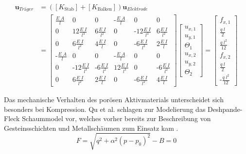  \begin{align}
    [K_{\text{Elektrode}}] \boldsymbol{u}_{Träger} &= ([K_{\text{Stab}}] + [K_{\text{Balken}}])\boldsymbol{u}_{Elektrode}\\
    &= 
    \begin{bmatrix}
        \frac{E \; A}{l} & 0     & 0     &  \text{-}\frac{E \; A}{l}  & 0 & 0 \\
        0 & 12 \frac{E \; I}{l^3}     & 6 \frac{E \; I}{l^2} & 0    &\text{-}12\frac{E \; I}{l^3}  & 6 \frac{E \; I}{l^2}       \\
        0 & 6 \frac{E \; I}{l^2} & 4 \frac{E \; I}{l}  & 0    & \text{-}6 \frac{E \; I}{l^2}  & 2 \frac{E \; I}{l} \\
        \text{-}\frac{E \; A}{l} & 0     & 0     &  \text{-}\frac{E \; A}{l}  & 0 & 0 \\
        0 & \text{-}12\frac{E \; I}{l^3}    & \text{-}6 \frac{E \; I}{l^2}& 12\frac{E \; I}{l^3}  & 0    & \text{-}6 \frac{E \; I}{l^2}      \\
        0 & 6 \frac{E \; I}{l^2} & 2 \frac{E \; I}{l} & 0    & \text{-}6 \frac{E \; I}{l^2} & 4 \frac{E \; I}{l}
    \end{bmatrix}
    \begin{bmatrix}
        u_{x,1}  \\
        u_{y,1}  \\
        \Theta_1 \\
        u_{x,2}  \\
        u_{y,2}  \\
        \Theta_2
    \end{bmatrix}
    = 
    \begin{bmatrix}
        f_{x,1} \\
        \frac{q \; l}{2}  \\
        \frac{q \; l^2}{12} \\
        f_{x,2} \\
        \frac{q \; l}{2}  \\
        \text{-}\frac{q \; l^2}{12}
    \end{bmatrix} 
 \end{align}



Das mechanische Verhalten des porösen Aktivmaterials unterscheidet sich besonders bei Kompression. Qu et al.  schlagen zur Modelierung das Deshpande-Fleck Schaummodel \cite{Deshpande2000} vor, welches vorher bereits zur Beschreibung von Gesteinsschichten und Metallschäumen zum Einsatz kam \cite{Qu2023}.
\begin{equation}
    F = \sqrt{q^2 + \alpha^2 (p-p_0)^2} - B = 0
\end{equation}


